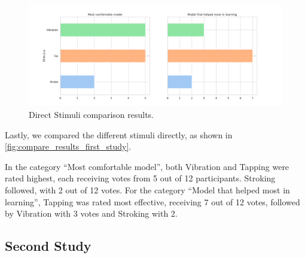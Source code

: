 \begin{figure}
    \centering
    \includegraphics[width=0.5\linewidth]{src/pictures/Study1Data_questionnaire/questions_compare_study1.pdf}
    \caption{Direct Stimuli comparison results.}
    \label{fig:compare_results_first_study}
\end{figure}
Lastly, we compared the different stimuli directly, as shown in \autoref{fig:compare_results_first_study}. 

In the category \enquote{Most comfortable model}, both Vibration and Tapping were rated highest, each receiving votes from 5 out of 12 participants. Stroking followed, with 2 out of 12 votes. For the category \enquote{Model that helped most in learning}, Tapping was rated most effective, receiving 7 out of 12 votes, followed by Vibration with 3 votes and Stroking with 2.




\subsection{Second Study}


